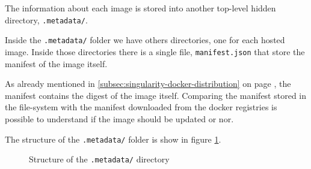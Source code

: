 The information about each image is stored into another top-level hidden directory, \texttt{.metadata/}.

Inside the \texttt{.metadata/} folder we have others directories, one for each hosted image.
Inside those directories there is a single file, \texttt{manifest.json} that store the manifest of the image itself.

As already mentioned in \ref{subsec:singularity-docker-distribution} on page \pageref{subsec:singularity-docker-distribution}, the manifest contains the digest of the image itself.
Comparing the manifest stored in the file-system with the manifest downloaded from the docker registries is possible to understand if the image should be updated or nor.

The structure of the \texttt{.metadata/} folder is show in figure \ref{fig:metadata-folder-structure}.

\begin{figure}
\caption{Structure of the \texttt{.metadata/} directory}
\label{fig:metadata-folder-structure}
\end{figure}



